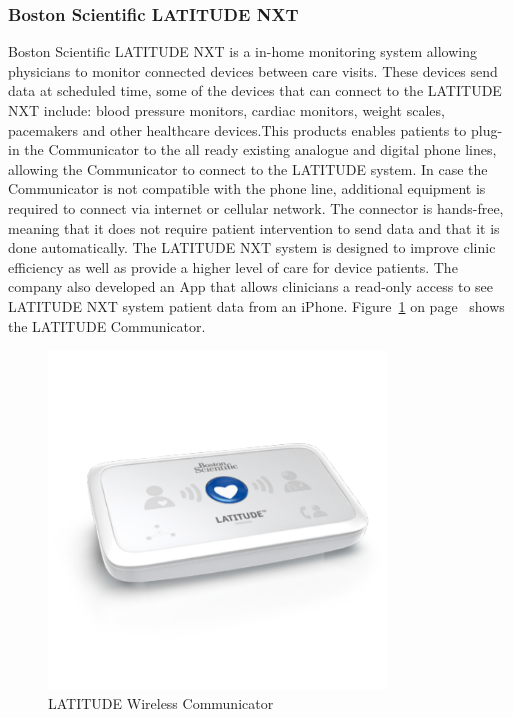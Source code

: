 \documentclass[12pt,]{article}
\numberwithin{figure}{section}
\begin{document}
\subsubsection{Boston Scientific LATITUDE NXT}
Boston Scientific LATITUDE NXT is a in-home monitoring system allowing physicians to monitor connected devices between care visits. These devices send data at scheduled time, some of the devices that can connect to the LATITUDE NXT include: blood pressure monitors, cardiac monitors, weight scales, pacemakers and other healthcare devices.This products enables patients to plug-in the Communicator to the all ready existing analogue and digital phone lines, allowing the Communicator to connect to the LATITUDE system. In case the Communicator is not compatible with the phone line, additional equipment is required to connect via internet or cellular network. The connector is hands-free, meaning that it does not require patient intervention to send data and that it is done automatically. The LATITUDE NXT system is designed to improve clinic efficiency as well as provide a higher level of care for device patients. The company also developed an App that allows clinicians a read-only access to see LATITUDE NXT system patient data from an iPhone. Figure~\ref{fig:4} on page~\pageref{fig:4} shows the LATITUDE Communicator.
\begin{figure}[h]
  	\begin{center}
    	\includegraphics[width=0.8\textwidth]{4}
  	\end{center}
  	\caption{LATITUDE Wireless Communicator \cite{BOS}}
	\label{fig:4}
\end{figure}
\end{document}
